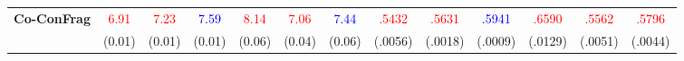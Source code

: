 \documentclass{article}
\theoremstyle{plain}
\theoremstyle{definition}
\theoremstyle{remark}
\begin{document}
\begin{table}[t]
\begin{center}
\begin{small}
{\begin{tabular}{lcccccccccccc}
        \multirow{2}{*}{\textbf{Co-ConFrag}} & \textcolor{red}{6.91} & \textcolor{red}{7.23} & \textcolor{blue}{7.59} & \textcolor{red}{8.14} & \textcolor{red}{7.06} & \textcolor{blue}{7.44} & \textcolor{red}{.5432} & \textcolor{red}{.5631} & \textcolor{blue}{.5941} & \textcolor{red}{.6590} & \textcolor{red}{.5562} & \textcolor{red}{.5796} \\
            & (0.01) & (0.01) & (0.01) & (0.06) & (0.04) & (0.06) &	(.0056) & (.0018) & (.0009) & (.0129) & (.0051) & (.0044) \\
        \bottomrule
    \end{tabular}
    }
    \end{small}
    \end{center}
    \label{tab:main_mae_2}
\end{table}
\end{document}
